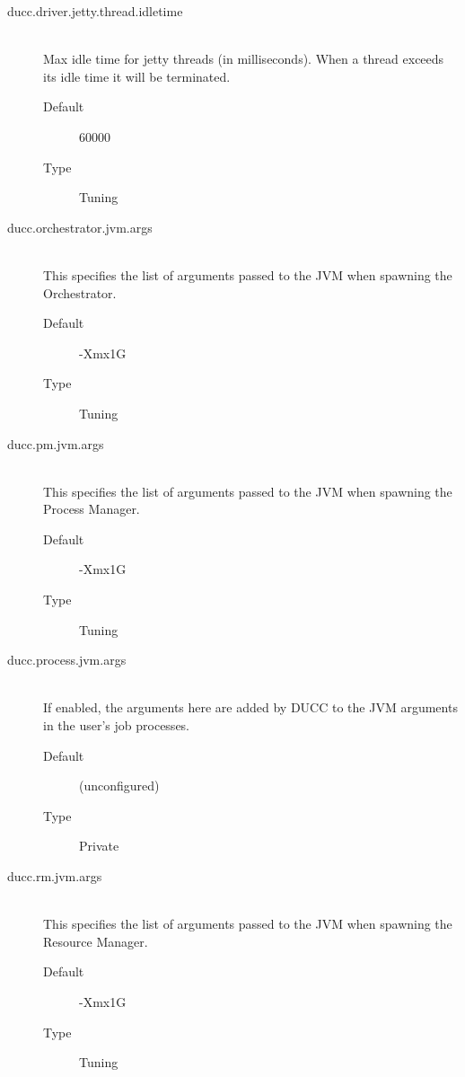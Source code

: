 \begin{description}
       \item[ducc.driver.jetty.thread.idletime] \hfill \\
         Max idle time for jetty threads (in milliseconds). When a thread exceeds
         its idle time it will be terminated.
         \begin{description} 
           \item[Default] 60000
           \item[Type] Tuning
         \end{description}

       \item[ducc.orchestrator.jvm.args] \hfill \\
         This specifies the list of arguments passed to the JVM when spawning the Orchestrator. 
         \begin{description}
           \item[Default] -Xmx1G 
           \item[Type] Tuning 
         \end{description}


       \item[ducc.pm.jvm.args] \hfill \\
         This specifies the list of arguments passed to the JVM when spawning the Process Manager. 
         \begin{description}
           \item[Default] -Xmx1G 
           \item[Type] Tuning 
         \end{description}

       \item[ducc.process.jvm.args] \hfill \\
         If enabled, the arguments here are added by DUCC to the JVM arguments in the user's job 
         processes. 
         \begin{description}
           \item[Default] (unconfigured) 
           \item[Type] Private 
         \end{description}
                   
       \item[ducc.rm.jvm.args] \hfill \\
         This specifies the list of arguments passed to the JVM when spawning the Resource 
         Manager. 
         \begin{description}           
           \item[Default] -Xmx1G 
           \item[Type] Tuning 
         \end{description}


\end{description}
